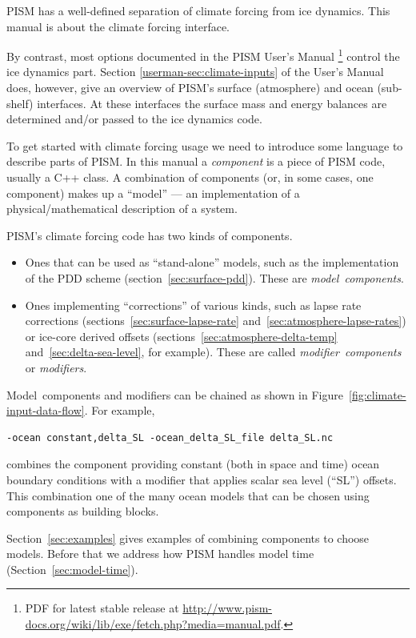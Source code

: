 \documentclass[titlepage,letterpaper,final]{scrartcl}
\begin{document}
PISM has a well-defined separation of climate forcing
from ice dynamics.  This manual is about the climate forcing interface.

By contrast, most options documented in the PISM User's Manual
\footnote{PDF for latest stable release at \url{http://www.pism-docs.org/wiki/lib/exe/fetch.php?media=manual.pdf}.}
control the ice dynamics part.  Section \ref*{userman-sec:climate-inputs} of
the User's Manual does, however, give an overview
of PISM's surface (atmosphere) and ocean (sub-shelf) interfaces.  At
these interfaces the surface mass and energy balances are determined
and/or passed to the ice dynamics code.

\vspace{0.3in}

To get started with climate forcing usage we need to introduce some language to describe parts of PISM.  In this manual a
\emph{component} is a piece of PISM code, usually a C++ class. A combination of
components (or, in some cases, one component) makes up a ``model'' --- an
implementation of a physical/mathematical description of a system.

PISM's climate forcing code has two kinds of components.
\begin{itemize}
\item Ones that can be used as ``stand-alone'' models, such as the
  implementation of the PDD scheme (section~\ref{sec:surface-pdd}). These are
  \emph{model~components}.
\item Ones implementing ``corrections'' of various kinds, such as lapse rate
  corrections (sections~\ref{sec:surface-lapse-rate}
  and~\ref{sec:atmosphere-lapse-rates}) or ice-core derived offsets
  (sections~\ref{sec:atmosphere-delta-temp} and~\ref{sec:delta-sea-level}, for
  example). These are called \emph{modifier~components} or \emph{modifiers}.
\end{itemize}

Model~components and modifiers can be chained as shown in
Figure~\ref{fig:climate-input-data-flow}. For example,
\begin{verbatim}
-ocean constant,delta_SL -ocean_delta_SL_file delta_SL.nc
\end{verbatim}
combines the component providing constant (both in space and time) ocean
boundary conditions with a modifier that
applies scalar sea level (``SL'') offsets. This combination one of the many ocean models that
can be chosen using components as building blocks.

Section~\ref{sec:examples} gives examples of combining components to
choose models.  Before that we address how PISM handles model time
(Section~\ref{sec:model-time}).
\end{document}

